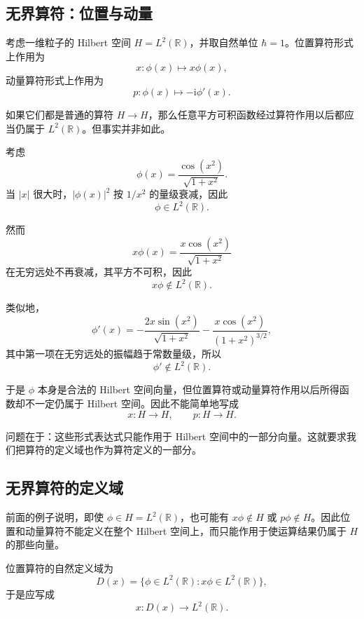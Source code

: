 \documentclass[UTF8,a4paper,11pt,openany]{ctexbook}
\begin{document}
\subsection{无界算符：位置与动量}

考虑一维粒子的 Hilbert 空间 $H=L^2(\mathbb R)$，并取自然单位 $\hbar=1$。位置算符形式上作用为
\begin{equation}
    x:\phi(x)\longmapsto x\phi(x),
\end{equation}
动量算符形式上作用为
\begin{equation}
    p:\phi(x)\longmapsto-\mathrm{i}\phi'(x).
\end{equation}

如果它们都是普通的算符 $H\to H$，那么任意平方可积函数经过算符作用以后都应当仍属于 $L^2(\mathbb R)$。但事实并非如此。

考虑
\begin{equation}
    \phi(x)
    =
    \frac{\cos(x^2)}{\sqrt{1+x^2}}.
\end{equation}
当 $|x|$ 很大时，$|\phi(x)|^2$ 按 $1/x^2$ 的量级衰减，因此
\[
\phi\in L^2(\mathbb R).
\]

然而
\[
x\phi(x)
=
\frac{x\cos(x^2)}{\sqrt{1+x^2}}
\]
在无穷远处不再衰减，其平方不可积，因此
\[
x\phi\notin L^2(\mathbb R).
\]

类似地，
\[
\phi'(x)
=
-\frac{2x\sin(x^2)}{\sqrt{1+x^2}}
-\frac{x\cos(x^2)}{(1+x^2)^{3/2}},
\]
其中第一项在无穷远处的振幅趋于常数量级，所以
\[
\phi'\notin L^2(\mathbb R).
\]

于是 $\phi$ 本身是合法的 Hilbert 空间向量，但位置算符或动量算符作用以后所得函数却不一定仍属于 Hilbert 空间。因此不能简单地写成
\[
x:H\to H,
\qquad
p:H\to H.
\]

问题在于：这些形式表达式只能作用于 Hilbert 空间中的一部分向量。这就要求我们把算符的定义域也作为算符定义的一部分。

\subsection{无界算符的定义域}

前面的例子说明，即使 $\phi\in H=L^2(\mathbb R)$，也可能有 $x\phi\notin H$ 或 $p\phi\notin H$。因此位置和动量算符不能定义在整个 Hilbert 空间上，而只能作用于使运算结果仍属于 $H$ 的那些向量。

位置算符的自然定义域为
\begin{equation}
    D(x)
    =
    \{\phi\in L^2(\mathbb R):x\phi\in L^2(\mathbb R)\},
\end{equation}
于是应写成
\[
x:D(x)\to L^2(\mathbb R).
\]
\end{document}
